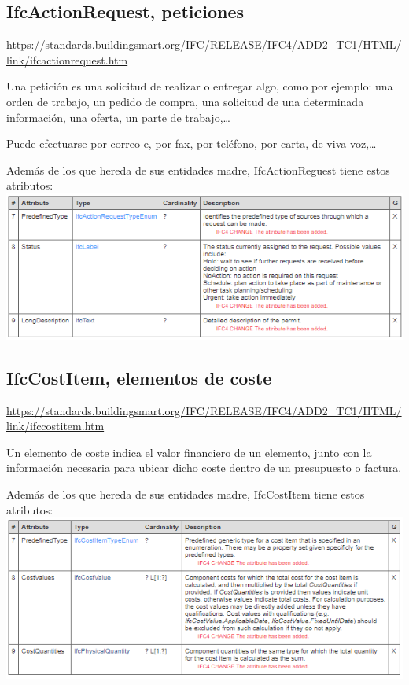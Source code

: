 \documentclass[spanish,12pt,a4paper,final,oneside]{book}
\begin{document}
\subsection{IfcActionRequest, peticiones}
\url{https://standards.buildingsmart.org/IFC/RELEASE/IFC4/ADD2_TC1/HTML/link/ifcactionrequest.htm}

Una petición es una solicitud de realizar o entregar algo, como por ejemplo: una orden de trabajo, un pedido de compra, una solicitud de una determinada información, una oferta, un parte de trabajo,\ldots  

Puede efectuarse por correo-e, por fax, por teléfono, por carta, de viva voz,\ldots

Además de los que hereda de sus entidades madre, IfcActionReguest tiene estos atributos:
\\ \includegraphics[width=\textwidth]{atributos de IfcActionRequest}

\subsection{IfcCostItem, elementos de coste}
\url{https://standards.buildingsmart.org/IFC/RELEASE/IFC4/ADD2_TC1/HTML/link/ifccostitem.htm}

Un elemento de coste indica el valor financiero de un elemento, junto con la información necesaria para ubicar dicho coste dentro de un presupuesto o factura.

Además de los que hereda de sus entidades madre, IfcCostItem tiene estos atributos:
\\ \includegraphics[width=\textwidth]{atributos de IfcCostItem}
\end{document}

